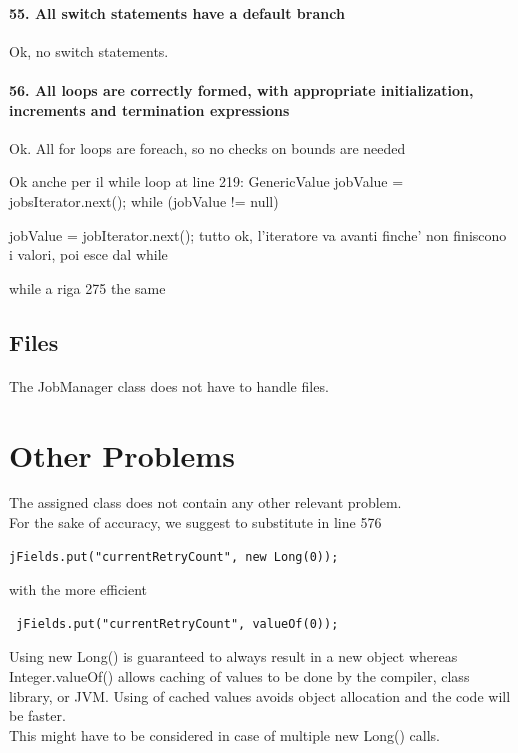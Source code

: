 \documentclass[english]{article}
\begin{document}
\paragraph{55. All switch statements have a default branch}
Ok, no switch statements.

\paragraph{56. All loops are correctly formed, with appropriate initialization, increments and termination expressions}
Ok.
All for loops are foreach, so no checks on bounds are needed

Ok anche per il while loop at line 219:
GenericValue jobValue = jobsIterator.next();
while (jobValue != null) {
jobValue = jobIterator.next();
tutto ok, l'iteratore va avanti finche' non finiscono i valori, poi esce dal while

while a riga 275 the same



\subsection{Files}
\paragraph{}
The JobManager class does not have to handle files.

\section{Other Problems} %
The assigned class does not contain any other relevant problem.\\
For the sake of accuracy, we suggest to substitute in line 576
\begin{lstlisting}
jFields.put("currentRetryCount", new Long(0));\end{lstlisting}
with the more efficient
\begin{lstlisting}
 jFields.put("currentRetryCount", valueOf(0));
\end{lstlisting}
Using new Long() is guaranteed to always result in a new object whereas Integer.valueOf() allows caching of values to be done by the compiler, class library, or JVM. Using of cached values avoids object allocation and the code will be faster.\\
This might have to be considered in case of multiple new Long() calls.

}
\end{document}
